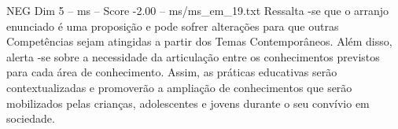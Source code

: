 \begin{textsample}{NEG Dim 5 – ms – Score -2.00 – ms/ms\_em\_19.txt}
Ressalta -se que o arranjo enunciado é uma proposição e pode sofrer alterações para que outras Competências sejam atingidas a partir dos Temas Contemporâneos.
Além disso, alerta -se sobre a necessidade da articulação entre os conhecimentos previstos para cada área de conhecimento.
Assim, as práticas educativas serão contextualizadas e promoverão a ampliação de conhecimentos que serão mobilizados pelas crianças, adolescentes e jovens durante o seu convívio em sociedade.

\end{textsample}
